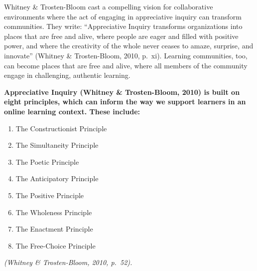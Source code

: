 \documentclass[
]{book}
\providecommand{\tightlist}{%
  \setlength{\itemsep}{0pt}\setlength{\parskip}{0pt}}
\begin{document}
Whitney \& Trosten-Bloom cast a compelling vision for collaborative environments where the act of engaging in appreciative inquiry can transform communities. They write: ``Appreciative Inquiry transforms organizations into places that are free and alive, where people are eager and filled with positive power, and where the creativity of the whole never ceases to amaze, surprise, and innovate'' (Whitney \& Trosten-Bloom, 2010, p.~xi). Learning communities, too, can become places that are free and alive, where all members of the community engage in challenging, authentic learning.

\textbf{Appreciative Inquiry (Whitney \& Trosten-Bloom, 2010) is built on eight principles, which can inform the way we support learners in an online learning context. These include:}

\begin{enumerate}
\def\labelenumi{\arabic{enumi}.}
\tightlist
\item
  The Constructionist Principle\\
\item
  The Simultaneity Principle\\
\item
  The Poetic Principle\\
\item
  The Anticipatory Principle\\
\item
  The Positive Principle\\
\item
  The Wholeness Principle\\
\item
  The Enactment Principle\\
\item
  The Free-Choice Principle
\end{enumerate}

\emph{(Whitney \& Trosten-Bloom, 2010, p.~52).}
\end{document}
